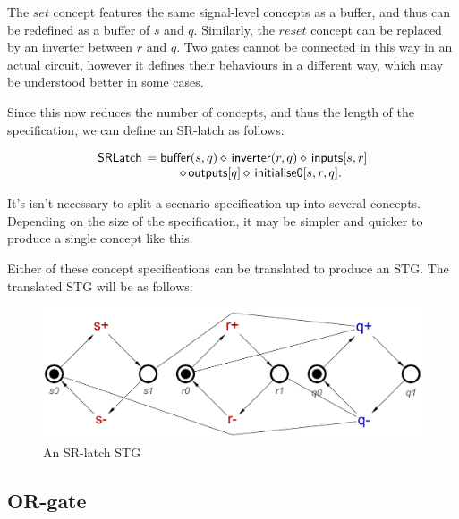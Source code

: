 \documentclass[british, journal]{IEEEtran}
\begin{document}
The $set$ concept features the same signal-level concepts as a buffer, and thus can be redefined
as a buffer of $s$ and $q$. Similarly, the $reset$ concept can be replaced by an inverter between
$r$ and $q$. Two gates cannot be connected in this way in an actual circuit, however
it defines their behaviours in a different way, which may be understood better in some cases.

Since this now reduces the number of concepts, and thus the length of the specification, we
can define an SR-latch as follows:

 \[
\begin{array}{lcl}
\mathsf{SRLatch}&\hspace{-2mm}=\mathsf{buffer}(s, q) \diamond\, \mathsf{inverter}(r, q) \diamond\, \mathsf{inputs}[s, r]\\ 
&\diamond\, \mathsf{outputs}[q] \diamond\, \mathsf{initialise0} [s, r, q].
\end{array}
\]

It's isn't necessary to split a scenario specification up into several concepts. 
Depending on the size of the specification, it may be simpler and quicker to 
produce a single concept like this.

Either of these concept specifications can be translated to produce an STG. 
The translated STG will be as follows:

\vspace{-3mm}

\begin{figure}[h]
\begin{centering}
\includegraphics[scale=0.32]{Images/sr-latch-stg}
\par\end{centering}
\vspace{-1mm}
\protect\caption{\label{fig:sr-latch-circuit} An SR-latch STG}
\vspace{-5mm}
\end{figure}


\subsection{OR-gate}
\end{document}
